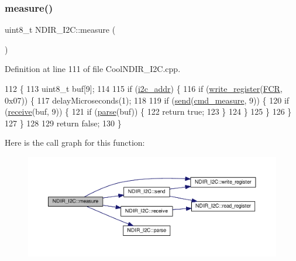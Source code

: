 \subsubsection{\texorpdfstring{measure()}{measure()}}
{\footnotesize\ttfamily uint8\+\_\+t N\+D\+I\+R\+\_\+\+I2\+C\+::measure (\begin{DoxyParamCaption}{ }\end{DoxyParamCaption})}



Definition at line 111 of file Cool\+N\+D\+I\+R\+\_\+\+I2\+C.\+cpp.


\begin{DoxyCode}
112 \{
113     uint8\_t buf[9];
114 
115     \textcolor{keywordflow}{if} (\hyperlink{class_n_d_i_r___i2_c_aac12069dd5a86a9ec6aa31ac9a44aabe}{i2c\_addr}) \{
116         \textcolor{keywordflow}{if} (\hyperlink{class_n_d_i_r___i2_c_a5de6a044b00e985f035edca07521e319}{write\_register}(\hyperlink{_cool_n_d_i_r___i2_c_8cpp_a264b36b13386e3f62fe69e04711bc006}{FCR}, 0x07)) \{
117             delayMicroseconds(1);
118 
119             \textcolor{keywordflow}{if} (\hyperlink{class_n_d_i_r___i2_c_aab0c04c2b7d08e99d12af044df179f0c}{send}(\hyperlink{class_n_d_i_r___i2_c_af47e04052a5fb25c79e7142b673aae28}{cmd\_measure}, 9)) \{
120                 \textcolor{keywordflow}{if} (\hyperlink{class_n_d_i_r___i2_c_aa6d2b8dd287f9c9015461cebb18f9abc}{receive}(buf, 9)) \{
121                     \textcolor{keywordflow}{if} (\hyperlink{class_n_d_i_r___i2_c_a907b756fc9244c7398b7d187b73cde94}{parse}(buf)) \{
122                         \textcolor{keywordflow}{return} \textcolor{keyword}{true};
123                     \}
124                 \}
125             \}
126         \}
127     \}
128 
129     \textcolor{keywordflow}{return} \textcolor{keyword}{false};
130 \}
\end{DoxyCode}
Here is the call graph for this function\+:\nopagebreak
\begin{figure}[H]
\begin{center}
\leavevmode
\includegraphics[width=350pt]{d6/ddb/class_n_d_i_r___i2_c_ab8f50d38501d498b802b822bd4844ede_cgraph}
\end{center}
\end{figure}
